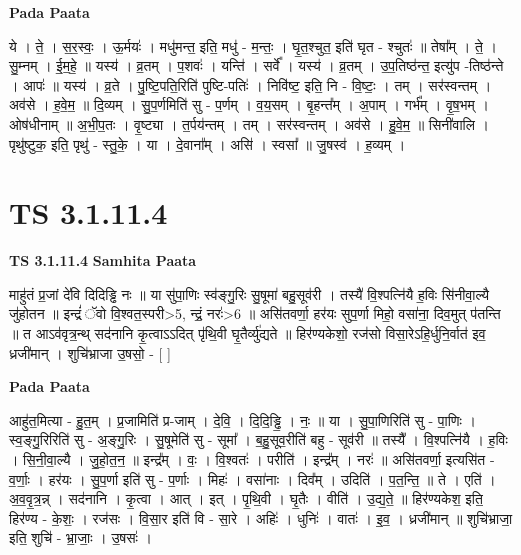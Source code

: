 \documentclass[17pt]{extarticle}
\begin{document}
\textbf{Pada Paata} \newline

ये । ते॒ । स॒र॒स्वः॒ । ऊ॒र्मयः॑ । मधु॑मन्त॒ इति॒ मधु॑ - म॒न्तः॒ । घृ॒त॒श्चुत॒ इति॑ घृत - श्चुतः॑ ॥ तेषा᳚म् । ते॒ । सु॒म्नम् । ई॒म॒हे॒ ॥ यस्य॑ । व्र॒तम् । प॒शवः॑ । यन्ति॑ । सर्वे᳚ । यस्य॑ । व्र॒तम् । उ॒प॒तिष्ठ॑न्त॒ इत्यु॑प -तिष्ठ॑न्ते । आपः॑ ॥ यस्य॑ । व्र॒ते । पु॒ष्टि॒पति॒रिति॑ पुष्टि-पतिः॑ । निवि॑ष्ट॒ इति॒ नि - वि॒ष्टः॒ । तम् । सर॑स्वन्तम् । अव॑से । ह॒वे॒म॒ ॥ दि॒व्यम् । सु॒प॒र्णमिति॑ सु - प॒र्णम् । व॒य॒सम् । बृ॒हन्त᳚म् । अ॒पाम् । गर्भ᳚म् । वृ॒ष॒भम् । ओष॑धीनाम् ॥ अ॒भी॒प॒तः । वृ॒ष्ट्या । त॒र्पय॑न्तम् । तम् । सर॑स्वन्तम् । अव॑से । हु॒वे॒म॒ ॥ सिनी॑वालि । पृथु॑ष्टुक॒ इति॒ पृथु॑ - स्तु॒के॒ । या । दे॒वाना᳚म् । असि॑ । स्वसा᳚ ॥ जु॒षस्व॑ । ह॒व्यम् ।  \newline





\section{ TS 3.1.11.4 }

\textbf{TS 3.1.11.4 } \newline
\textbf{Samhita Paata} \newline

माहु॑तं प्र॒जां दे॑वि दिदिड्ढि नः ॥ या सु॑पा॒णिः स्व॑ङ्गु॒रिः सु॒षूमा॑ बहु॒सूव॑री । तस्यै॑ वि॒श्पत्नि॑यै ह॒विः सि॑नीवा॒ल्यै जु॑होतन ॥ इन्द्रं॑ ॅवो वि॒श्वत॒स्परी>5, न्द्रं॒ नरः॑>6 ॥ असि॑तवर्णा॒ हर॑यः सुप॒र्णा मिहो॒ वसा॑ना॒ दिव॒मुत् प॑तन्ति ॥ त आऽव॑वृत्र॒न्थ् सद॑नानि कृ॒त्वाऽऽदित् पृ॑थि॒वी घृ॒तैर्व्यु॑द्यते ॥ हिर॑ण्यकेशो॒ रज॑सो विसा॒रेऽहि॒र्धुनि॒र्वात॑ इव॒ ध्रजी॑मान् । शुचि॑भ्राजा उ॒षसो॒ - [  ] \newline

\textbf{Pada Paata} \newline

आहु॑त॒मित्या - हु॒त॒म् । प्र॒जामिति॑ प्र-जाम् । दे॒वि॒ । दि॒दि॒ड्ढि॒ । नः॒ ॥ या । सु॒पा॒णिरिति॑ सु - पा॒णिः । स्व॒ङ्गु॒रिरिति॑ सु - अ॒ङ्गु॒रिः । सु॒षूमेति॑ सु - सूमा᳚ । ब॒हु॒सूव॒रीति॑ बहु - सूव॑री ॥ तस्यै᳚ । वि॒श्पत्नि॑यै । ह॒विः । सि॒नी॒वा॒ल्यै । जु॒हो॒त॒न॒ ॥ इन्द्र᳚म् । वः॒ । वि॒श्वतः॑ । परीति॑ । इन्द्र᳚म् । नरः॑ ॥ असि॑तवर्णा॒ इत्यसि॑त - व॒र्णाः॒ । हर॑यः । सु॒प॒र्णा इति॑ सु - प॒र्णाः । मिहः॑ । वसा॑नाः । दिव᳚म् । उदिति॑ । प॒त॒न्ति॒ ॥ ते । एति॑ । अ॒व॒वृ॒त्र॒न्न् । सद॑नानि । कृ॒त्वा । आत् । इत् । पृ॒थि॒वी । घृ॒तैः । वीति॑ । उ॒द्य॒ते॒ ॥ हिर॑ण्यकेश॒ इति॒ हिर॑ण्य - के॒शः॒ । रज॑सः । वि॒सा॒र इति॑ वि - सा॒रे । अहिः॑ । धुनिः॑ । वातः॑ । इ॒व॒ । ध्रजी॑मान् ॥ शुचि॑भ्राजा॒ इति॒ शुचि॑ - भ्रा॒जाः॒ । उ॒षसः॑ ।  \newline
\end{document}
